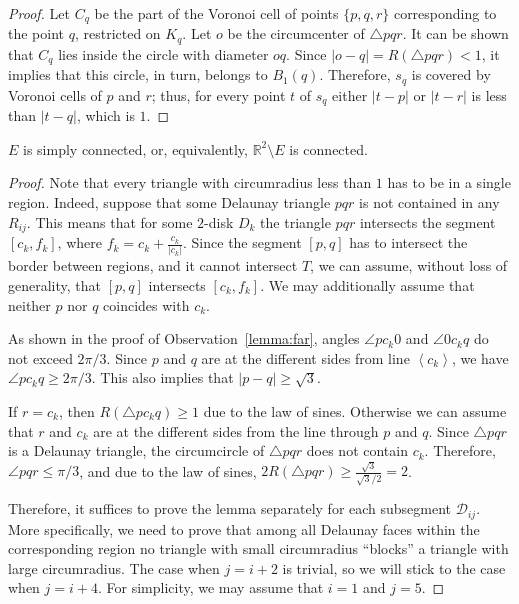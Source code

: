 \begin{appendices}
\begin{proof}
Let $C_q$ be the part of the Voronoi cell of points $\{p, q, r\}$ corresponding to the point $q$, restricted on $K_q$. Let $o$ be the circumcenter of $\triangle pqr$. It can be shown that $C_q$ lies inside the circle with diameter $oq$. Since $|o - q| = R(\triangle pqr) < 1$, it implies that this circle, in turn, belongs to $B_1(q)$. Therefore, $s_q$ is covered by Voronoi cells of $p$ and $r$; thus, for every point $t$ of $s_q$ either $|t - p|$ or $|t - r|$ is less than $|t - q|$, which is $1$.
\end{proof}

\begin{lemma}\label{lemma:E-is-connected}
$E$ is simply connected, or, equivalently, $\mathbb{R}^2\setminus E$ is connected.
\end{lemma}

\begin{proof}
Note that every triangle with circumradius less than $1$ has to be in a single region.
Indeed, suppose that some Delaunay triangle $pqr$ is not contained in any $R_{ij}$. This means that for some $2$-disk $D_k$ the triangle $pqr$ intersects the segment $[c_k, f_k]$, where $f_k = c_k + \frac{c_k}{|c_k|}$.
Since the segment $[p, q]$ has to intersect the border between regions, and it cannot intersect $T$, we can assume, without loss of generality, that $[p, q]$ intersects $[c_k, f_k]$. We may additionally assume that neither $p$ nor $q$ coincides with $c_k$.

As shown in the proof of Observation~\ref{lemma:far}, angles $\angle pc_k0$ and $\angle 0c_kq$ do not exceed $2\pi/3$. Since $p$ and $q$ are at the different sides from line $\left<c_k\right>$, we have $\angle pc_kq\geq2\pi/3$. This also implies that $|p - q|\geq \sqrt{3}$.

If $r = c_k$, then $R(\triangle pc_kq)\geq 1$ due to the law of sines. Otherwise we can assume that $r$ and $c_k$ are at the different sides from the line through $p$ and $q$. Since $\triangle pqr$ is a Delaunay triangle, the circumcircle of $\triangle pqr$ does not contain $c_k$. Therefore, $\angle pqr\leq\pi/3$, and due to the law of sines, $2R(\triangle pqr)\geq \frac{\sqrt{3}}{\sqrt{3}/2} = 2$.

Therefore, it suffices to prove the lemma separately for each subsegment $\mathcal{D}_{ij}$. More specifically, we need to prove that among all Delaunay faces within the corresponding region no triangle with small circumradius ``blocks'' a triangle with large circumradius. The case when $j = i + 2$ is trivial, so we will stick to the case when $j = i + 4$. For simplicity, we may assume that $i = 1$ and $j = 5$.


\end{proof}
\end{appendices}
